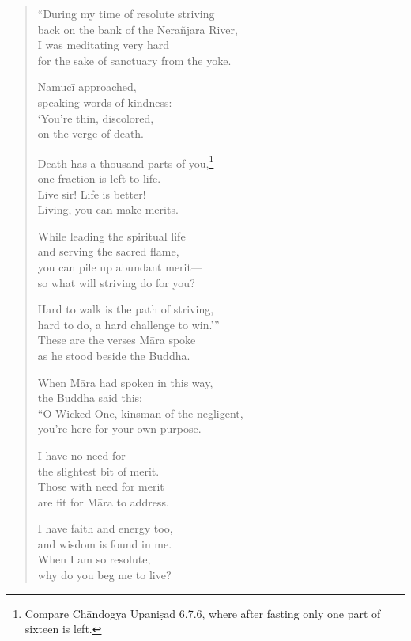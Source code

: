 \documentclass[12pt,openany]{book}%
\begin{document}
\begin{verse}%
“During my time of resolute striving \\
back on the bank of the \textsanskrit{Nerañjara} River, \\
I was meditating very hard \\
for the sake of sanctuary from the yoke. 

\textsanskrit{Namucī} approached, \\
speaking words of kindness: \\
‘You’re thin, discolored, \\
on the verge of death. 

Death has a thousand parts of you,\footnote{Compare \textsanskrit{Chāndogya} \textsanskrit{Upaniṣad} 6.7.6, where after fasting only one part of sixteen is left. } \\
one fraction is left to life. \\
Live sir! Life is better! \\
Living, you can make merits. 

While leading the spiritual life \\
and serving the sacred flame, \\
you can pile up abundant merit—\\
so what will striving do for you? 

Hard to walk is the path of striving, \\
hard to do, a hard challenge to win.’” \\
These are the verses \textsanskrit{Māra} spoke \\
as he stood beside the Buddha. 

When \textsanskrit{Māra} had spoken in this way, \\
the Buddha said this: \\
“O Wicked One, kinsman of the negligent, \\
you’re here for your own purpose. 

I have no need for \\
the slightest bit of merit. \\
Those with need for merit \\
are fit for \textsanskrit{Māra} to address. 

I have faith and energy too, \\
and wisdom is found in me. \\
When I am so resolute, \\
why do you beg me to live? 


\end{verse}
\end{document}
